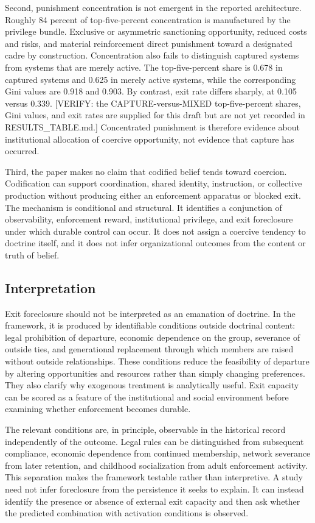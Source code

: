 \documentclass[12pt]{article}
\begin{document}
Second, punishment concentration is not emergent in the reported architecture. Roughly 84 percent of top-five-percent concentration is manufactured by the privilege bundle. Exclusive or asymmetric sanctioning opportunity, reduced costs and risks, and material reinforcement direct punishment toward a designated cadre by construction. Concentration also fails to distinguish captured systems from systems that are merely active. The top-five-percent share is 0.678 in captured systems and 0.625 in merely active systems, while the corresponding Gini values are 0.918 and 0.903. By contrast, exit rate differs sharply, at 0.105 versus 0.339. [VERIFY: the CAPTURE-versus-MIXED top-five-percent shares, Gini values, and exit rates are supplied for this draft but are not yet recorded in RESULTS_TABLE.md.] Concentrated punishment is therefore evidence about institutional allocation of coercive opportunity, not evidence that capture has occurred.

Third, the paper makes no claim that codified belief tends toward coercion. Codification can support coordination, shared identity, instruction, or collective production without producing either an enforcement apparatus or blocked exit. The mechanism is conditional and structural. It identifies a conjunction of observability, enforcement reward, institutional privilege, and exit foreclosure under which durable control can occur. It does not assign a coercive tendency to doctrine itself, and it does not infer organizational outcomes from the content or truth of belief.

\subsection{Interpretation}

Exit foreclosure should not be interpreted as an emanation of doctrine. In the framework, it is produced by identifiable conditions outside doctrinal content: legal prohibition of departure, economic dependence on the group, severance of outside ties, and generational replacement through which members are raised without outside relationships. These conditions reduce the feasibility of departure by altering opportunities and resources rather than simply changing preferences. They also clarify why exogenous treatment is analytically useful. Exit capacity can be scored as a feature of the institutional and social environment before examining whether enforcement becomes durable.

The relevant conditions are, in principle, observable in the historical record independently of the outcome. Legal rules can be distinguished from subsequent compliance, economic dependence from continued membership, network severance from later retention, and childhood socialization from adult enforcement activity. This separation makes the framework testable rather than interpretive. A study need not infer foreclosure from the persistence it seeks to explain. It can instead identify the presence or absence of external exit capacity and then ask whether the predicted combination with activation conditions is observed.
\end{document}

